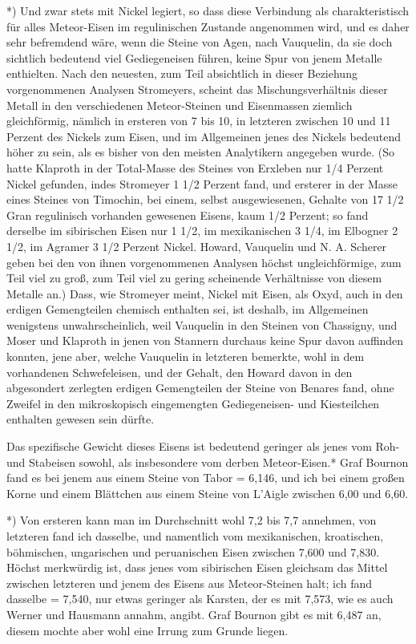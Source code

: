 \documentclass[a4paper, 11pt, oneside, german]{article}
\begin{document}
*) Und zwar stets mit Nickel legiert, so dass diese Verbindung als charakteristisch für alles Meteor-Eisen im regulinischen Zustande angenommen wird, und es daher sehr befremdend wäre, wenn die Steine von Agen, nach Vauquelin, da sie doch sichtlich bedeutend viel Gediegeneisen führen, keine Spur von jenem Metalle enthielten. Nach den neuesten, zum Teil absichtlich in dieser Beziehung vorgenommenen Analysen Stromeyers, scheint das Mischungsverhältnis dieser Metall in den verschiedenen Meteor-Steinen und Eisenmassen ziemlich gleichförmig, nämlich in ersteren von 7 bis 10, in letzteren zwischen 10 und 11 Perzent des Nickels zum Eisen, und im Allgemeinen jenes des Nickels bedeutend höher zu sein, als es bisher von den meisten Analytikern angegeben wurde. (So hatte Klaproth in der Total-Masse des Steines von Erxleben nur 1/4 Perzent Nickel gefunden, indes Stromeyer 1 1/2 Perzent fand, und ersterer in der Masse eines Steines von Timochin, bei einem, selbst ausgewiesenen, Gehalte von 17 1/2 Gran regulinisch vorhanden gewesenen Eisens, kaum 1/2 Perzent; so fand derselbe im sibirischen Eisen nur 1 1/2, im mexikanischen 3 1/4, im Elbogner 2 1/2, im Agramer 3 1/2 Perzent Nickel. Howard, Vauquelin und N. A. Scherer geben bei den von ihnen vorgenommenen Analysen höchst ungleichförmige, zum Teil viel zu groß, zum Teil viel zu gering scheinende Verhältnisse von diesem Metalle an.) Dass, wie Stromeyer meint, Nickel mit Eisen, als Oxyd, auch in den erdigen Gemengteilen chemisch enthalten sei, ist deshalb, im Allgemeinen wenigstens unwahrscheinlich, weil Vauquelin in den Steinen von Chassigny, und Moser und Klaproth in jenen von Stannern durchaus keine Spur davon auffinden konnten, jene aber, welche Vauquelin in letzteren bemerkte, wohl in dem vorhandenen Schwefeleisen, und der Gehalt, den Howard davon in den abgesondert zerlegten erdigen Gemengteilen der Steine von Benares fand, ohne Zweifel in den mikroskopisch eingemengten Gediegeneisen- und Kiesteilchen enthalten gewesen sein dürfte.

Das spezifische Gewicht dieses Eisens ist bedeutend geringer als jenes vom Roh- und Stabeisen sowohl, als insbesondere vom derben Meteor-Eisen.* Graf Bournon fand es bei jenem aus einem Steine von Tabor = 6,146, und ich bei einem großen Korne und einem Blättchen aus einem Steine von L'Aigle zwischen 6,00 und 6,60.

*) Von ersteren kann man im Durchschnitt wohl 7,2 bis 7,7 annehmen, von letzteren fand ich dasselbe, und namentlich vom mexikanischen, kroatischen, böhmischen, ungarischen und peruanischen Eisen zwischen 7,600 und 7,830. Höchst merkwürdig ist, dass jenes vom sibirischen Eisen gleichsam das Mittel zwischen letzteren und jenem des Eisens aus Meteor-Steinen halt; ich fand dasselbe = 7,540, nur etwas geringer als Karsten, der es mit 7,573, wie es auch Werner und Hausmann annahm, angibt. Graf Bournon gibt es mit 6,487 an, diesem mochte aber wohl eine Irrung zum Grunde liegen.
\end{document}
